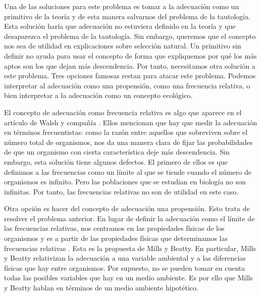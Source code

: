 
Una de las soluciones para este problema es tomar a la adecuación como un primitivo de la teoría y de esta manera salvarnos del problema de la tautología. Esta solución haría que adecuación no estuviera definido en la teoría y que desaparezca el problema de la tautología. Sin embargo, queremos que el concepto nos sea de utilidad en explicaciones sobre selección natural. Un primitivo sin definir no ayuda para usar el concepto de forma que expliquemos por qué los más aptos son los que dejan más descendencia. Por tanto, necesitamos otra solución a este problema. Tres opciones famosas restan para atacar este problema. Podemos interpretar al adecuación como una propensión, como una frecuencia relativa, o bien interpretar a la adecuación como un concepto ecológico.

El concepto de adecuación como frecuencia relativa es algo que aparece en el artículo de Walsh y compañía \citeyear{Walsh2002}. Ellos mencionan que hay que medir la adecuación en términos frecuentistas: como la razón entre aquellos que sobreviven sobre el número total de organismos, nos da una manera clara de fijar las probabilidades de que un organismo con cierta característica deje más descendencia. Sin embargo, esta solución tiene algunos defectos. El primero de ellos es que definimos a las frecuencias como un límite al que se tiende cuando el número de organismos es infinito. Pero las poblaciones que se estudian en biología no son infinitas. Por tanto, las frecuencias relativas no son de utilidad en este caso.

Otra opción es hacer del concepto de adecuación una propensión. Esto trata de resolver el problema anterior. En lugar de definir la adecuación como el límite de las frecuencias relativas, nos centramos en las propiedades físicas de los organismos y es a partir de las propiedades físicas que determinamos las frecuencias relativas \cite{Mills1979}. Esta es la propuesta de Mills y Beatty. En particular, Mills y Beatty relativizan la adecuación a una variable ambiental y a las diferencias físicas que hay entre organismos. Por supuesto, no se pueden tomar en cuenta todas las posibles variables que hay en un medio ambiente. Es por ello que Mills y Beatty hablan en términos de un medio ambiente hipotético.

